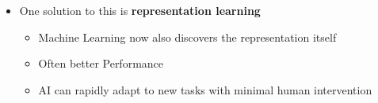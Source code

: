 \documentclass[t]{beamer}
\begin{document}
\begin{frame}
\begin{itemize}
\begin{itemize}
            \item One solution to this is \textbf{representation learning}
            \begin{itemize}
                \item Machine Learning now also discovers the representation itself
                \item Often better Performance
                \item AI can rapidly adapt to new tasks with minimal human intervention
            \end{itemize}
        \end{itemize}
    \end{itemize}
\end{frame}
\end{document}
